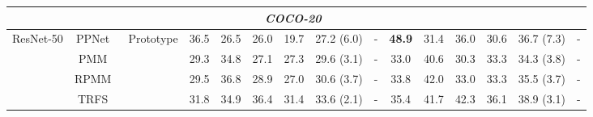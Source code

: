 \documentclass[runningheads,table,xcdraw]{llncs}
\begin{document}
\begin{table*}[t]
{\begin{tabular}{ccccccccccccccc}
\multicolumn{15}{c}{\textit{COCO-20}~\cite{nguyen2019feature}}                                                                                                                                                                                                                                                                                                                                                                                                                             \\ \hline
\multicolumn{1}{c|}{\multirow{7}{*}{ResNet-50}}  & \multicolumn{1}{c|}{PPNet~\cite{liu2020part}}                       & \multicolumn{1}{c|}{\multirow{5}{*}{Prototype}}  & 36.5          & 26.5          & 26.0          & \multicolumn{1}{c|}{19.7}          & \multicolumn{1}{c|}{27.2 (6.0)}          & \multicolumn{1}{c|}{-}             & \textbf{48.9} & 31.4          & 36.0          & \multicolumn{1}{c|}{30.6}          & \multicolumn{1}{c|}{36.7 (7.3)}          & -             \\
\multicolumn{1}{c|}{}                            & \multicolumn{1}{c|}{PMM~\cite{yang2020prototype}}                   & \multicolumn{1}{c|}{}                            & 29.3          & 34.8          & 27.1          & \multicolumn{1}{c|}{27.3}          & \multicolumn{1}{c|}{29.6 (3.1)}          & \multicolumn{1}{c|}{-}             & 33.0          & 40.6          & 30.3          & \multicolumn{1}{c|}{33.3}          & \multicolumn{1}{c|}{34.3 (3.8)}          & -             \\
\multicolumn{1}{c|}{}                            & \multicolumn{1}{c|}{RPMM~\cite{yang2020prototype}}                  & \multicolumn{1}{c|}{}                            & 29.5          & 36.8          & 28.9          & \multicolumn{1}{c|}{27.0}          & \multicolumn{1}{c|}{30.6 (3.7)}          & \multicolumn{1}{c|}{-}             & 33.8          & 42.0          & 33.0          & \multicolumn{1}{c|}{33.3}          & \multicolumn{1}{c|}{35.5 (3.7)}          & -             \\
\multicolumn{1}{c|}{}                            & \multicolumn{1}{c|}{TRFS~\cite{sun2021boosting}}             & \multicolumn{1}{c|}{}                            & 31.8          & 34.9          & 36.4          & \multicolumn{1}{c|}{31.4}          & \multicolumn{1}{c|}{33.6 (2.1)}          & \multicolumn{1}{c|}{-}             & 35.4          & 41.7          & 42.3          & \multicolumn{1}{c|}{36.1}          & \multicolumn{1}{c|}{38.9 (3.1)}          & -             \\

\end{tabular}}
\end{table*}
\end{document}
